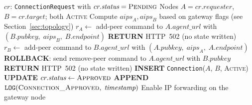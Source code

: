 \documentclass[conference]{IEEEtran}
\begin{document}
\begin{algorithm}[!t]
\caption{Connection Approval Procedure}
\label{alg:conn_approval}
\begin{algorithmic}[1]
\REQUIRE $cr$: \texttt{ConnectionRequest} with $cr.\textit{status} = \textsc{Pending}$
\REQUIRE Nodes $A = cr.\textit{requester}$, $B = cr.\textit{target}$; both \textsc{Active}
\STATE Compute $\textit{aips}_A, \textit{aips}_B$ based on gateway flags
       (see Section~\ref{sec:topology})
\STATE $r_A \leftarrow$ add-peer command to $A.\textit{agent\_url}$
       with $(B.\textit{pubkey},\; \textit{aips}_B,\; B.\textit{endpoint})$
  \STATE \textbf{RETURN} HTTP~502 (no state written)
\ENDIF
\STATE $r_B \leftarrow$ add-peer command to $B.\textit{agent\_url}$
       with $(A.\textit{pubkey},\; \textit{aips}_A,\; A.\textit{endpoint})$
  \STATE \textbf{ROLLBACK}: send remove-peer command to $A.\textit{agent\_url}$
         with $B.\textit{pubkey}$ 
  \STATE \textbf{RETURN} HTTP~502 (no state written)
\ENDIF
\STATE \textbf{INSERT} \texttt{Connection}($A$, $B$, \textsc{Active})
\STATE \textbf{UPDATE} $cr.\textit{status} \leftarrow \textsc{Approved}$
\STATE \textbf{APPEND} $\texttt{LOG}(\textsc{Connection\_Approved},\;\textit{timestamp})$
  \STATE Enable IP forwarding on the gateway node
\ENDIF
\end{algorithmic}
\end{algorithm}
\end{document}
